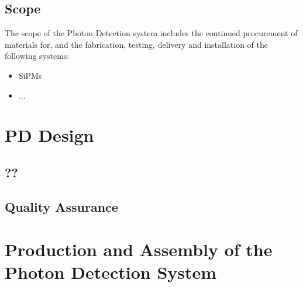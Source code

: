 

\subsection{Scope}
\label{sec:fdsp-pd-scope}

The scope of the Photon Detection system includes the continued procurement of materials for, and the fabrication, testing, delivery and installation of the following systems: 


\begin{itemize}
\item SiPMs 
\item  ...
\end{itemize}



\section{PD Design}
\label{sec:fdsp-pd-design}




\subsection{??}
\label{sec:fdsp-pd-??}

\subsection{Quality Assurance}
\label{sec:fdsp-pd-qa}




\section{Production and Assembly of the Photon Detection System}
\label{sec:fdsp-pd-prod-assy}

